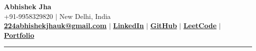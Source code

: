 \documentclass[a4paper,10pt]{article}
\newcommand{\sectdivider}{\noindent\rule{\linewidth}{0.5pt}}
\begin{document}
\begin{center}
    {\huge \bfseries Abhishek Jha} \\
    +91-9958329820 $\vert$ New Delhi, India \\
    \href{mailto:224abhishekjha@gmail.com}{{\textbf{224abhishekjhauk@gmail.com}}} $\vert$ 
    \href{https://www.linkedin.com/in/abhishek-jha-087a761a8/}{{\textbf{LinkedIn}}} $\vert$ 
    \href{https://github.com/AbhiPandit1}{{\textbf{GitHub}}} $\vert$ 
    \textbf{ \href{https://leetcode.com/u/Abhishek_pandit/}{{\textbf{LeetCode}}}} $\vert$ 
    \href{https://www.abhishekportfolio.me}{{\textbf{Portfolio}}}
\end{center}

\vspace{-1em}
\sectdivider
\vspace{0.2em}
\end{document}
